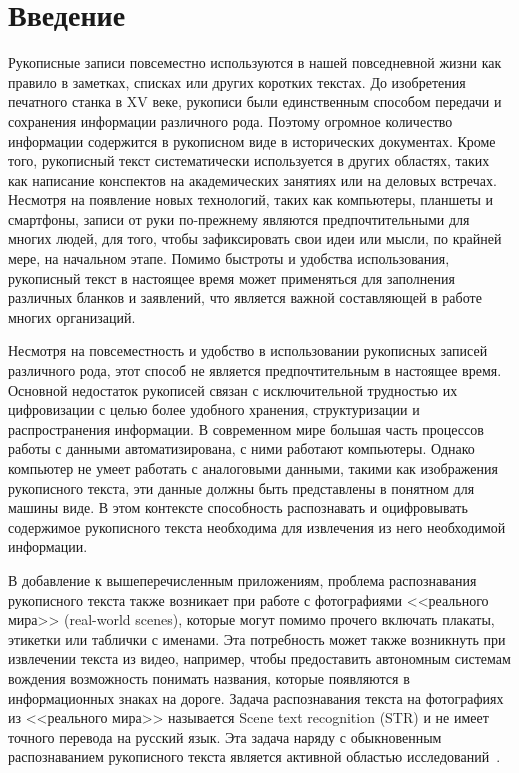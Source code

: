 \section{Введение}
\label{sec:Chapter0} 


Рукописные записи повсеместно используются в нашей повседневной жизни как правило в заметках, списках или других коротких текстах.
До изобретения печатного станка в XV веке, рукописи были единственным способом передачи и сохранения информации различного рода.
Поэтому огромное количество информации содержится в рукописном виде в исторических документах.
Кроме того, рукописный текст систематически используется в других областях, таких как написание конспектов на академических занятиях или на деловых встречах.
Несмотря на появление новых технологий, таких как компьютеры, планшеты и смартфоны, записи от руки по-прежнему являются предпочтительными для многих людей,
для того, чтобы зафиксировать свои идеи или мысли, по крайней мере, на начальном этапе.
Помимо быстроты и удобства использования, рукописный текст в настоящее время может применяться для заполнения различных бланков и заявлений,
что является важной составляющей в работе многих организаций.

Несмотря на повсеместность и удобство в использовании рукописных записей различного рода, этот способ не является предпочтительным в настоящее время.
Основной недостаток рукописей связан с исключительной трудностью их цифровизации с целью более удобного хранения, структуризации и распространения информации.
В современном мире большая часть процессов работы с данными автоматизирована, с ними работают компьютеры.
Однако компьютер не умеет работать с аналоговыми данными, такими как изображения рукописного текста, эти данные должны быть представлены в понятном для машины виде.
В этом контексте способность распознавать и оцифровывать содержимое рукописного текста необходима для извлечения из него необходимой информации.

В добавление к вышеперечисленным приложениям, проблема распознавания рукописного текста также возникает при работе
с фотографиями <<реального мира>> (real-world scenes), которые могут помимо прочего включать плакаты, этикетки или таблички с именами.
Эта потребность может также возникнуть при извлечении текста из видео, например, чтобы предоставить автономным системам вождения возможность понимать названия,
которые появляются в информационных знаках на дороге.
Задача распознавания текста на фотографиях из <<реального мира>> называется Scene text recognition (STR) и не имеет точного перевода на русский язык.
Эта задача наряду с обыкновенным распознаванием рукописного текста является активной областью исследований~\cite{zhu2016scene}.

